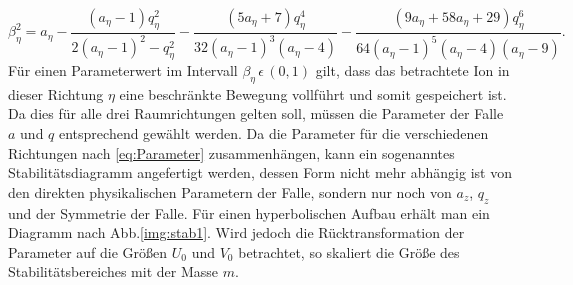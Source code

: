\documentclass[numbers=noenddot,a4paper,notitlepage,twoside,BCOR15mm]{scrartcl}
\begin{document}
	\begin{equation}
		\beta_\eta^2 = a_\eta - \frac{\left(a_\eta - 1\right)q_\eta^2}{2\left(a_\eta -1\right)^2-q_\eta^2}-\frac{(5a_\eta+7)q_\eta^4}{32(a_\eta-1)^3(a_\eta-4)}-\frac{(9a_\eta+58a_\eta+29)q_\eta^6}{64(a_\eta-1)^5(a_\eta-4)(a_\eta-9)}.
	\end{equation}
	Für einen Parameterwert im Intervall $\beta_\eta\,\epsilon\,(0,1)$ gilt, dass das betrachtete Ion in dieser Richtung $\eta$ eine beschränkte Bewegung vollführt und somit gespeichert ist. Da dies für alle drei Raumrichtungen gelten soll, müssen die Parameter der Falle $a$ und $q$ entsprechend gewählt werden. Da die Parameter für die verschiedenen Richtungen nach \eqref{eq:Parameter} zusammenhängen, kann ein sogenanntes Stabilitätsdiagramm angefertigt werden, dessen Form nicht mehr abhängig ist von den direkten physikalischen Parametern der Falle, sondern nur noch von $a_z$, $q_z$ und der Symmetrie der Falle. Für einen hyperbolischen Aufbau erhält man ein Diagramm nach Abb.\ref{img:stab1}. Wird jedoch die Rücktransformation der Parameter auf die Größen $U_0$ und $V_0$ betrachtet, so skaliert die Größe des Stabilitätsbereiches mit der Masse $m$.\\
\end{document}
